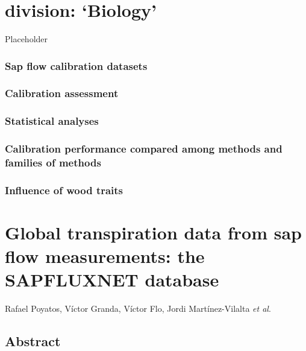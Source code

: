\documentclass[11pt,twoside]{reedthesis}
\begin{document}
\chapter{\texorpdfstring{division:
`Biology'}{division: Biology}}\label{division-biology}

Placeholder

\subsection{Sap flow calibration
datasets}\label{sap-flow-calibration-datasets}

\subsection{Calibration assessment}\label{calibration-assessment}

\subsection{Statistical analyses}\label{statistical-analyses}

\subsection{Calibration performance compared among methods and families
of
methods}\label{calibration-performance-compared-among-methods-and-families-of-methods}

\subsection{Influence of wood traits}\label{influence-of-wood-traits}

\chapter[The SAPFLUXNET database]{Global transpiration data from sap flow measurements: the SAPFLUXNET database}

\setlength{\parskip}{0.2cm plus4mm minus3mm} \setlength{\parindent}{0pt}
Rafael Poyatos, Víctor Granda, Víctor Flo, Jordi Martínez-Vilalta
\emph{et al}. \newpage
\setlength{\parindent}{30pt}

\section*{Abstract}
\end{document}
